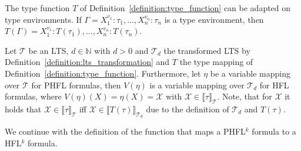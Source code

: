 The type function $T$ of Definition~\ref{definition:type_function} can be adapted on type environments. If
$\Gamma = X_1^{v_1} \colon \tau_1, \dots, X_n^{v_n} \colon \tau_n$ is a type environment, then $T(\Gamma) =
X_1^{v_1} \colon T(\tau_1), \dots, X_n^{v_n} \colon T(\tau_n)$.

\begin{definition}
    \label{definition:variable_mapping_function}
    Let $\mathcal{T}$ be an LTS, $d \in \mathbb{N}$ with $d >0$ and $\mathcal{T}_d$ the transformed LTS by
    Definition~\ref{definition:lts_transformation} and $T$ the type mapping of
    Definition~\ref{definition:type_function}. Furthermore, let $\eta$ be a variable mapping over $\mathcal{T}$ for PHFL
    formulas, then $V(\eta)$ is a variable mapping over $\mathcal{T}_d$ for HFL formulas, where $V(\eta)(X) = \eta(X) = \mathcal{X}$ with $\mathcal{X} \in \llbracket \tau \rrbracket_\mathcal{T}$. Note, that for $\mathcal{X}$ it holds that $\mathcal{X} \in \llbracket \tau
    \rrbracket_\mathcal{T}$ iff $\mathcal{X} \in \llbracket T(\tau)\rrbracket_{\mathcal{T}_d}$ due to the definition
    of $\mathcal{T}_d$ and $T(\tau)$.
\end{definition}

We continue with the definition of the function that maps a PHFL$^k$ formula to a HFL$^k$ formula.


